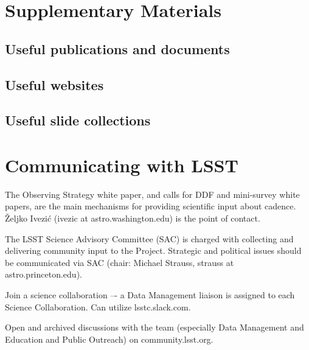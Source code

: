 \documentclass[DM,lsstdraft,toc,usenatbib]{lsstdoc}
\begin{document}
\section{Supplementary Materials} 

\subsection{Useful publications and documents}

\subsection{Useful websites}

\subsection{Useful slide collections}


\section{Communicating with LSST} 

The Observing Strategy white paper, and calls for DDF and mini-survey white papers, 
are the main mechanisms for providing scientific input about cadence. 
\v{Z}eljko Ivezi\'{c} (ivezic at astro.washington.edu) is the point of contact.

The LSST Science Advisory Committee (SAC) is charged with collecting and delivering 
community input to the Project. Strategic and political issues should be communicated 
via SAC (chair: Michael Strauss, strauss at astro.princeton.edu).

Join a science collaboration –- a Data Management liaison is assigned to each Science Collaboration.
Can utilize lsstc.slack.com.

Open and archived discussions with the team (especially Data Management and Education and 
Public Outreach) on community.lsst.org.
\end{document}
